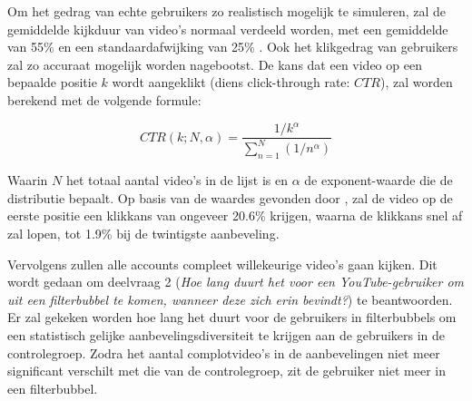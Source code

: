 \documentclass{uva-inf-article}
\begin{document}
Om het gedrag van echte gebruikers zo realistisch mogelijk te simuleren, zal de gemiddelde kijkduur van video’s normaal verdeeld worden, met een gemiddelde van 55\% en een standaardafwijking van 25\% \citep{park2016data}. Ook het klikgedrag van gebruikers zal zo accuraat mogelijk worden nagebootst. De kans dat een video op een bepaalde positie $k$ wordt aangeklikt (diens click-through rate: $CTR$), zal worden berekend met de volgende formule:

\begin{equation}
CTR(k; N, \alpha) = \frac{1/k^\alpha}{\sum_{n=1}^{N} (1/n^\alpha)}
\end{equation}

\noindent Waarin $N$ het totaal aantal video's in de lijst is en $\alpha$ de exponent-waarde die de distributie bepaalt. Op basis van de waardes gevonden door \citet{zhou2010impact}, zal de video op de eerste positie een klikkans van ongeveer 20.6\% krijgen, waarna de klikkans snel af zal lopen, tot 1.9\% bij de twintigste aanbeveling. 

Vervolgens zullen alle accounts compleet willekeurige video's gaan kijken. Dit wordt gedaan om deelvraag 2 (\textit{Hoe lang duurt het voor een YouTube-gebruiker om uit een filterbubbel te komen, wanneer deze zich erin bevindt?}) te beantwoorden. Er zal gekeken worden hoe lang het duurt voor de gebruikers in filterbubbels om een statistisch gelijke aanbevelingsdiversiteit te krijgen aan de gebruikers in de controlegroep. Zodra het aantal complotvideo's in de aanbevelingen niet meer significant verschilt met die van de controlegroep, zit de gebruiker niet meer in een filterbubbel.
\end{document}
